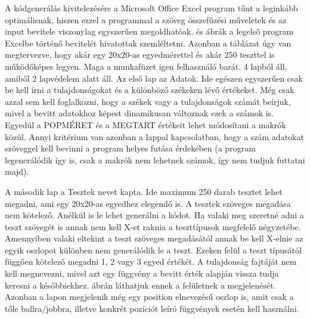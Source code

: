 \documentclass[12ppt,a4paper,oneside]{report}
\begin{document}
    {A kódgenerálás kivitelezésére a Microsoft Office Excel program tűnt a leginkább optimálisnak, hiszen ezzel a programmal a szöveg összefűzési műveletek és az input bevitele viszonylag egyszerűen megoldhatóak.  és  ábrák a legelső program Excelbe történő bevitelét hivatottak szemléltetni. Azonban a táblázat úgy van megtervezve, hogy akár egy 20x20-as egyedmérettel és akár 250 teszttel is működőképes legyen. Maga a munkafüzet igen felhasználó barát. 4 lapból áll, amiből 2 lapvédelem alatt áll.}
    {Az első lap az Adatok. Ide egészen egyszerűen csak be kell írni a tulajdonságokat és a különböző székeken lévő értékeket. Még csak azzal sem kell foglalkozni, hogy a székek vagy a tulajdonságok számát beírjuk, mivel a bevitt adatokhoz képest dinamikusan változnak ezek a számok is. Egyedül a POPMÉRET és a MEGTART értékeit lehet módosítani a makrók közül. Annyi kritérium van azonban a lappal kapcsolatban, hogy a szám adatokat szöveggel kell bevinni a program helyes futása érdekében (a program legenerálódik így is, csak a makrók nem lehetnek számok, így nem tudjuk futtatni majd).}
    
      
    {A második lap a Tesztek nevet kapta. Ide maximum 250 darab tesztet lehet megadni, ami egy 20x20-as egyedhez elegendő is. A tesztek szöveges megadása nem kötelező. Anélkül is le lehet generálni a kódot. Ha valaki meg szeretné adni a teszt szövegét is annak nem kell X-et raknia a teszttípusok megfelelő négyzetébe. Amennyiben valaki eltekint a teszt szöveges megadásától annak be kell X-elnie az egyik oszlopot különben nem generálódik le a teszt. Ezeken felül a teszt típusától függően kötelező megadni 1, 2 vagy 3 egyed értékét. A tulajdonság fajtáját nem kell megnevezni, mivel azt egy függvény a bevitt érték alapján vissza tudja keresni a későbbiekhez.  ábrán láthatjuk ennek a felületnek a megjelenését. Azonban a lapon megjelenik még egy position elnevezésű oszlop is, amit csak a tőle ballra/jobbra, illetve konkrét pozíciót leíró függvények esetén kell használni.}
    
\end{document}
